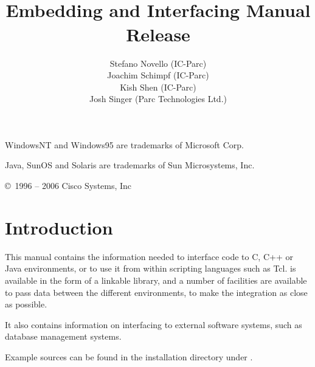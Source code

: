 \documentclass[11pt,a4paper]{book}
\title{
    {\Large\bf \eclipse}\\
    \vspace{1cm}
    {\Huge\bf Embedding and Interfacing Manual}\\
    \vspace{1cm}
    Release \eclipseversion}
\author{
Stefano Novello (IC-Parc) \\
Joachim Schimpf (IC-Parc) \\
Kish Shen       (IC-Parc) \\
Josh Singer	(Parc Technologies Ltd.)
}
\begin{document}
\maketitle


\setcounter{page}{2}
\pagestyle{empty}

\vfill
{}

\bigskip\bigskip
WindowsNT and Windows95 are trademarks of Microsoft Corp.

Java, SunOS and Solaris are trademarks of Sun Microsystems, Inc.

\copyright\ 1996 -- 2006 Cisco Systems, Inc
\bigskip\bigskip\bigskip\bigskip\bigskip\bigskip

\cleardoublepage
\pagestyle{plain}

\tableofcontents

\cleardoublepage
{}

\chapter{Introduction}
This manual contains the information needed to interface {\eclipse}
code to C, C++ or Java environments, or to use it from within scripting
languages such as Tcl.
{\eclipse} is available in the form of a linkable library,
and a number of facilities are available to pass data between the
different environments, to make the integration as close as possible.

It also contains information on interfacing to external software systems,
such as database management systems.

Example sources can be found in the {\eclipse} installation directory
under .











\appendix





\newpage
%
\printindex
%
%
\end{document}

